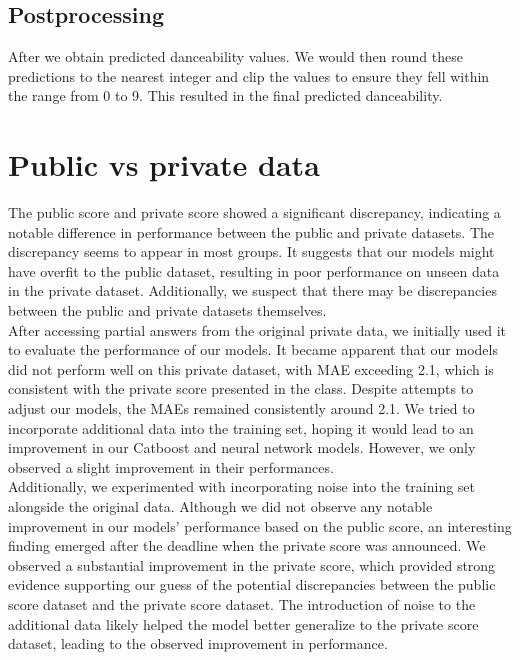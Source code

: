 \documentclass{article}
\begin{document}
\subsection{Postprocessing}
After we  obtain predicted danceability values. We would then round these predictions to the nearest integer and clip the values to ensure they fell within the range from 0 to 9. This resulted in the final predicted danceability. 
\section{Public vs private data}
The public score and private score showed a significant discrepancy, indicating a notable difference in performance between the public and private datasets. The discrepancy seems to appear in most groups. It suggests that our models might have overfit to the public dataset, resulting in poor performance on unseen data in the private dataset. Additionally, we suspect that there may be discrepancies between the public and private datasets themselves.\\

\noindent After accessing partial answers from the original private data, we initially used it to evaluate the performance of our models. It became apparent that our models did not perform well on this private dataset, with MAE exceeding 2.1, which is consistent with the private score presented in the class. Despite attempts to adjust our models, the MAEs remained consistently around 2.1. We tried to incorporate additional data into the training set, hoping it would lead to an improvement in our Catboost and neural network models. However, we only observed a slight improvement in their performances.\\

\noindent Additionally, we experimented with incorporating noise into the training set alongside the original data. Although we did not observe any notable improvement in our models' performance based on the public score, an interesting finding emerged after the deadline when the private score was announced. We observed a substantial improvement in the private score, which provided strong evidence supporting our guess of the potential discrepancies between the public score dataset and the private score dataset. The introduction of noise to the additional data likely helped the model better generalize to the private score dataset, leading to the observed improvement in performance.
\end{document}
